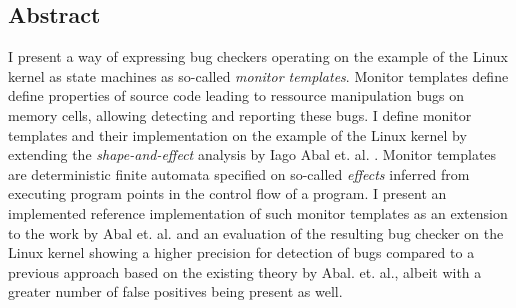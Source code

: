 \subsection*{Abstract}

I present a way of expressing bug checkers operating on the example of the Linux kernel as state machines as so-called \textit{monitor templates}. Monitor templates define define properties of source code leading to ressource manipulation bugs on memory cells, allowing detecting and reporting these bugs. I define monitor templates and their implementation on the example of the Linux kernel by extending the \textit{shape-and-effect} analysis by Iago Abal et. al. \cite{Abal2017EffectiveBF}. Monitor templates are deterministic finite automata specified on so-called \textit{effects} inferred from executing program points in the control flow of a program. I present an implemented reference implementation of such monitor templates as an extension to the work by Abal et. al. and an evaluation of the resulting bug checker on the Linux kernel showing a higher precision for detection of bugs compared to a previous approach based on the existing theory by Abal. et. al.\cite{research-project}, albeit with a greater number of false positives being present as well.  